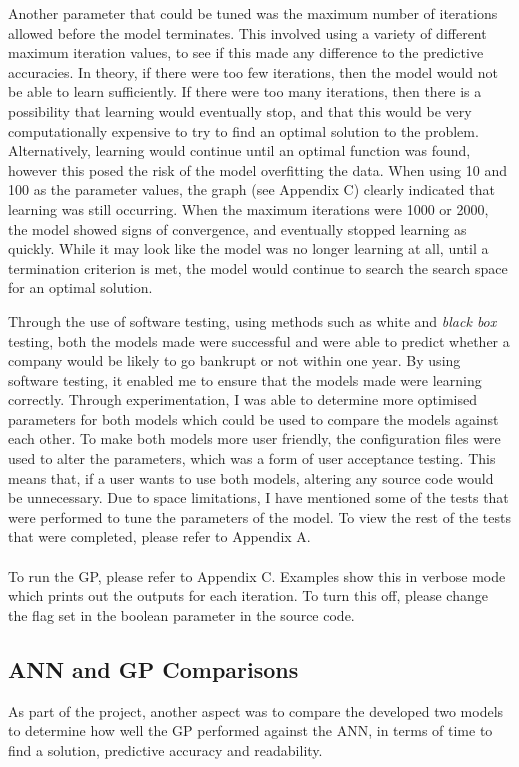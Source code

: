 \documentclass[11pt]{article}
\begin{document}
Another parameter that could be tuned was the maximum number of iterations allowed before the model terminates. This involved using a variety of different maximum iteration values, to see if this made any difference to the predictive accuracies. In theory, if there were too few iterations, then the model would not be able to learn sufficiently. If there were too many iterations, then there is a possibility that learning would eventually stop, and that this would be very computationally expensive to try to find an optimal solution to the problem. Alternatively, learning would continue until an optimal function was found, however this posed the risk of the model overfitting the data. When using 10 and 100 as the parameter values, the graph (see Appendix C) clearly indicated that learning was still occurring. When the maximum iterations were 1000 or 2000, the model showed signs of convergence, and eventually stopped learning as quickly. While it may look like the model was no longer learning at all, until a termination criterion is met, the model would continue to search the search space for an optimal solution.

Through the use of software testing, using methods such as white and \textit{black box} testing, both the models made were successful and were able to predict whether a company would be likely to go bankrupt or not within one year. By using software testing, it enabled me to ensure that the models made were learning correctly. Through experimentation, I was able to determine more optimised parameters for both models which could be used to compare the models against each other. To make both models more user friendly, the configuration files were used to alter the parameters, which was a form of user acceptance testing. This means that, if a user wants to use both models, altering any source code would be unnecessary. Due to space limitations, I have mentioned some of the tests that were performed to tune the parameters of the model. To view the rest of the tests that were completed, please refer to Appendix A.\\
\\
To run the GP, please refer to Appendix C. Examples show this in verbose mode which prints out the outputs for each iteration. To turn this off, please change the flag set in the boolean parameter in the source code. 
\subsection{ANN and GP Comparisons}\label{subsec:ANNGPC}
As part of the project, another aspect was to compare the developed two models to determine how well the GP performed against the ANN, in terms of time to find a solution, predictive accuracy and readability. \\
\end{document}
